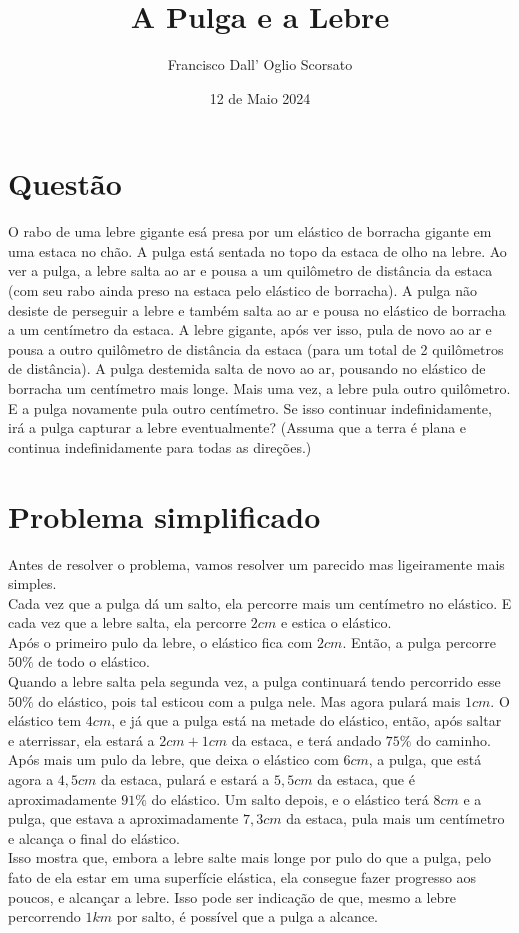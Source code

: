 \documentclass{article}
\title{A Pulga e a Lebre}
\author{Francisco Dall' Oglio Scorsato}
\date{12 de Maio 2024}
\begin{document}
\maketitle

\section{Questão}
O rabo de uma lebre gigante esá presa por um elástico de borracha gigante em uma estaca no chão. A pulga está sentada no topo da estaca de olho na lebre. Ao ver a pulga, a lebre salta ao ar e pousa a um quilômetro de distância da estaca (com seu rabo ainda preso na estaca pelo elástico de borracha). A pulga não desiste de perseguir a lebre e também salta ao ar e pousa no elástico de borracha a um centímetro da estaca. A lebre gigante, após ver isso, pula de novo ao ar e pousa a outro quilômetro de distância da estaca (para um total de 2 quilômetros de distância). A pulga destemida salta de novo ao ar, pousando no elástico de borracha um centímetro mais longe. Mais uma vez, a lebre pula outro quilômetro. E a pulga novamente pula outro centímetro. Se isso continuar indefinidamente, irá a pulga capturar a lebre eventualmente? (Assuma que a terra é plana e continua indefinidamente para todas as direções.)

\section{Problema simplificado}

    Antes de resolver o problema, vamos resolver um parecido mas ligeiramente mais simples.\\
    Cada vez que a pulga dá um salto, ela percorre mais um centímetro no elástico. E cada vez que a lebre salta, ela percorre \(2cm\) e estica o elástico.\\
    Após o primeiro pulo da lebre, o elástico fica com \(2cm\). Então, a pulga percorre \(50\%\) de todo o elástico.\\
    Quando a lebre salta pela segunda vez, a pulga continuará tendo percorrido esse \(50\%\) do elástico, pois tal esticou com a pulga nele. Mas agora pulará mais \(1cm\). O elástico tem \(4cm\), e já que a pulga está na metade do elástico, então, após saltar e aterrissar, ela estará a \(2cm+1cm\) da estaca, e terá andado \(75\%\) do caminho.\\
    Após mais um pulo da lebre, que deixa o elástico com \(6cm\), a pulga, que está agora a \(4,5cm\) da estaca, pulará e estará a \(5,5cm\) da estaca, que é aproximadamente \(91\%\) do elástico. Um salto depois, e o elástico terá \(8cm\) e a pulga, que estava a aproximadamente \(7,3cm\) da estaca, pula mais um centímetro e alcança o final do elástico.\\
    Isso mostra que, embora a lebre salte mais longe por pulo do que a pulga, pelo fato de ela estar em uma superfície elástica, ela consegue fazer progresso aos poucos, e alcançar a lebre. Isso pode ser indicação de que, mesmo a lebre percorrendo \(1km\) por salto, é possível que a pulga a alcance.
\end{document}
